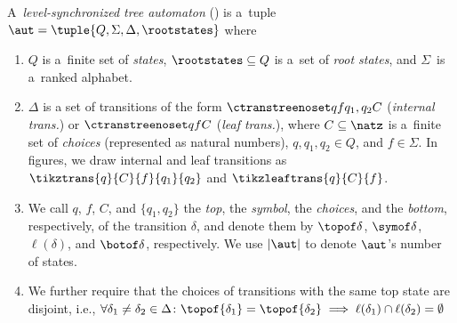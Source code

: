 \begin{definition}
A~\emph{level-synchronized tree automaton} (\lsta) is a~tuple $\aut = \tuple{Q, \Sigma, \Delta, \rootstates}$ where 
\begin{enumerate}
    \item $Q$ is a~finite set of \emph{states}, $\rootstates \subseteq Q$ is a~set of \emph{root states}, and $\Sigma$~is a~ranked alphabet.
    \item $\Delta$ is a set of  transitions of the form
      $\ctranstreenoset q f {q_1,q_2}{C}$ (\emph{internal trans.}) or $\ctranstreenoset q f {}{C}$ (\emph{leaf trans.}), where
      $C\subseteq \natz$ is a~finite set of \emph{choices} (represented as natural
      numbers), $q, q_1, q_2 \in Q$, and $f\in \Sigma$. In figures, we draw internal and leaf transitions as $\tikztrans{q}{C}{f}{q_1}{q_2}$ and $\tikzleaftrans{q}{C}{f}$.
      
    \item We call $q$, $f$, $C$, and $\{q_1,q_2\}$ the \emph{top}, the \emph{symbol}, the \emph{choices}, and the \emph{bottom}, respectively, of the transition $\delta$, 
and denote them by $\topof \delta$, $\symof \delta$, $\ell(\delta)$, and $\botof \delta$, respectively. We use $|\aut|$ to denote $\aut$'s number of states.
    \item We further require that the choices of transitions with the same top
      state are disjoint, i.e., $\forall \delta_1\ne\delta_2\in\Delta\colon \topof{\delta_1}=\topof{\delta_2}\implies\ell(\delta_1)\cap\ell(\delta_2)=\emptyset$
\end{enumerate}    
\end{definition}






